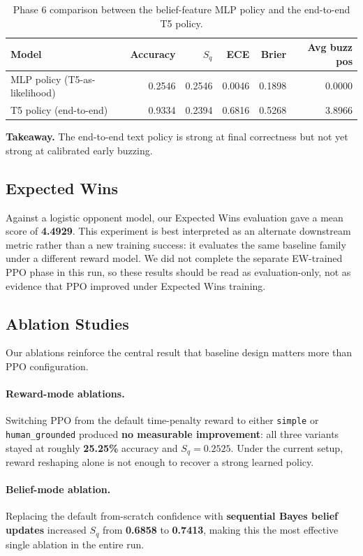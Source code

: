 \documentclass[11pt]{article}
\begin{document}
\begin{table}[h]
\centering
\begin{tabular}{lrrrrr}
\toprule
Model & Accuracy & $S_q$ & ECE & Brier & Avg buzz pos \\
\midrule
MLP policy (T5-as-likelihood) & 0.2546 & 0.2546 & 0.0046 & 0.1898 & 0.0000 \\
T5 policy (end-to-end) & 0.9334 & 0.2394 & 0.6816 & 0.5268 & 3.8966 \\
\bottomrule
\end{tabular}
\caption{Phase 6 comparison between the belief-feature MLP policy and the
end-to-end T5 policy.}
\end{table}

\noindent\textbf{Takeaway.} The end-to-end text policy is strong at final
correctness but not yet strong at calibrated early buzzing.

\subsection{Expected Wins}

Against a logistic opponent model, our Expected Wins evaluation gave a mean
score of \textbf{4.4929}. This experiment is best interpreted as an alternate
downstream metric rather than a new training success: it evaluates the same
baseline family under a different reward model. We did not complete the
separate EW-trained PPO phase in this run, so these results should be read as
evaluation-only, not as evidence that PPO improved under Expected Wins
training.

\subsection{Ablation Studies}

Our ablations reinforce the central result that baseline design matters more
than PPO configuration.

\paragraph{Reward-mode ablations.}
Switching PPO from the default time-penalty reward to either \texttt{simple} or
\texttt{human\_grounded} produced \textbf{no measurable improvement}: all three
variants stayed at roughly \textbf{25.25\%} accuracy and
\textbf{$S_q = 0.2525$}. Under the current setup, reward reshaping alone is not
enough to recover a strong learned policy.

\paragraph{Belief-mode ablation.}
Replacing the default from-scratch confidence with \textbf{sequential Bayes
belief updates} increased $S_q$ from \textbf{0.6858} to \textbf{0.7413},
making this the most effective single ablation in the entire run.
\end{document}
